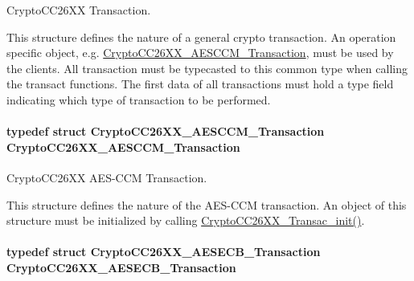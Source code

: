 Crypto\-C\-C26\-X\-X Transaction. 

This structure defines the nature of a general crypto transaction. An operation specific object, e.\-g. \hyperlink{struct_crypto_c_c26_x_x___a_e_s_c_c_m___transaction}{Crypto\-C\-C26\-X\-X\-\_\-\-A\-E\-S\-C\-C\-M\-\_\-\-Transaction}, must be used by the clients. All transaction must be typecasted to this common type when calling the transact functions. The first data of all transactions must hold a type field indicating which type of transaction to be performed. 
\paragraph[{Crypto\-C\-C26\-X\-X\-\_\-\-A\-E\-S\-C\-C\-M\-\_\-\-Transaction}]{\setlength{\rightskip}{0pt plus 5cm}typedef struct {\bf Crypto\-C\-C26\-X\-X\-\_\-\-A\-E\-S\-C\-C\-M\-\_\-\-Transaction}  {\bf Crypto\-C\-C26\-X\-X\-\_\-\-A\-E\-S\-C\-C\-M\-\_\-\-Transaction}}\label{_crypto_c_c26_x_x_8h_a9cf6019bce243720cebc70eb8310682e}


Crypto\-C\-C26\-X\-X A\-E\-S-\/\-C\-C\-M Transaction. 

This structure defines the nature of the A\-E\-S-\/\-C\-C\-M transaction. An object of this structure must be initialized by calling \hyperlink{_crypto_c_c26_x_x_8h_afb3ea8faceda234cdd62c5f53e203946}{Crypto\-C\-C26\-X\-X\-\_\-\-Transac\-\_\-init()}. 
\paragraph[{Crypto\-C\-C26\-X\-X\-\_\-\-A\-E\-S\-E\-C\-B\-\_\-\-Transaction}]{\setlength{\rightskip}{0pt plus 5cm}typedef struct {\bf Crypto\-C\-C26\-X\-X\-\_\-\-A\-E\-S\-E\-C\-B\-\_\-\-Transaction}  {\bf Crypto\-C\-C26\-X\-X\-\_\-\-A\-E\-S\-E\-C\-B\-\_\-\-Transaction}}\label{_crypto_c_c26_x_x_8h_a49f5f56e3a3f2f1aa354067e4261533f}


